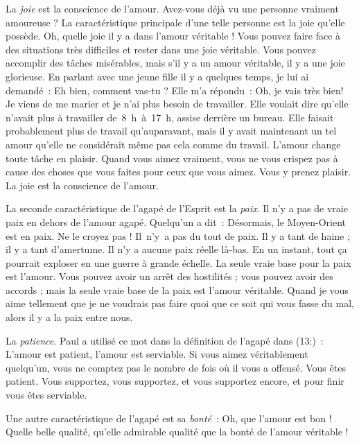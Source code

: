 La \emph{joie} est la conscience de l'amour.
 Avez-vous déjà vu une
 personne vraiment amoureuse ?
 La caractéristique principale d'une telle personne est la joie
 qu'elle possède. Oh, quelle joie il y a dans l'amour véritable !
 Vous pouvez faire face à des situations très difficiles
 et rester dans une joie véritable. Vous pouvez accomplir
 des tâches misérables, mais s'il y a un amour véritable,
 il y a une joie glorieuse. En parlant avec une jeune fille
 il y a quelques temps, je lui ai demandé~:
 \Og Eh bien, comment vas-tu ? \Fg{} Elle m'a répondu~:
 \Og Oh, je vais très bien! Je viens de me marier et je n'ai plus besoin
 de travailler. \Fg{}
 Elle voulait dire qu'elle n'avait plus à travailler de~8~h~à~17~h,
 assise derrière un bureau. Elle faisait probablement plus de travail
 qu'auparavant, mais il y avait maintenant un tel amour
 qu'elle ne considérait même pas cela comme du travail.
 L'amour change toute tâche en plaisir. Quand vous aimez vraiment,
 vous ne vous crispez pas à cause des choses que vous faites
 pour ceux que vous aimez. Vous y prenez plaisir.
 La joie est la conscience de l'amour.

La seconde caractéristique de l'agapé de l'Esprit est la \emph{paix}.
 Il n'y a pas de vraie paix en dehors de l'amour agapé.
 Quelqu'un a dit~: \Og Désormais, le Moyen-Orient est en paix. \Fg{}
 Ne le croyez pas ! Il~n'y~a pas du tout de paix.
 Il y a tant de haine ; il y a tant d'amertume.
 Il n'y a aucune paix réelle là-bas. En un instant, tout ça pourrait
 exploser en une guerre à grande échelle.
 La seule vraie base pour la paix est l'amour.
 Vous pouvez avoir un arrêt des hostilités ; vous pouvez avoir des accords ;
 mais la seule vraie base de la paix est l'amour véritable.
 Quand je vous aime tellement que je ne voudrais pas faire
 quoi que ce soit qui vous fasse du mal, alors il y a la paix entre nous.

La \emph{patience}. Paul a utilisé ce mot dans la définition de l'agapé
 dans (13:)~:
 \Og L'amour est patient, l'amour est serviable. \Fg{}
 Si vous aimez véritablement quelqu'un, vous ne comptez pas
 le nombre de fois où il vous a offensé. Vous êtes patient.
 Vous supportez, vous supportez, et vous supportez encore,
 et pour finir vous êtes serviable.

Une autre caractéristique de l'agapé est sa \emph{bonté}~:
 Oh, que l'amour est bon ! Quelle belle qualité,
 qu'elle admirable qualité que la bonté de l'amour véritable !

